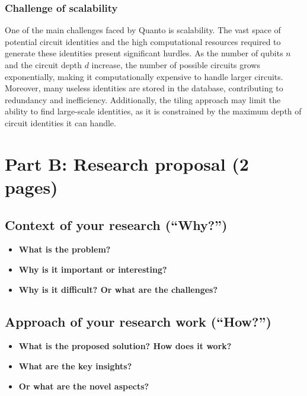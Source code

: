\subsubsection{Challenge of scalability}
One of the main challenges faced by Quanto is scalability. The vast space of potential circuit identities and the high computational resources required to generate these identities present significant hurdles. As the number of qubits $n$ and the circuit depth $d$ increase, the number of possible circuits grows exponentially, making it computationally expensive to handle larger circuits. Moreover, many useless identities are stored in the database, contributing to redundancy and inefficiency. Additionally, the tiling approach may limit the ability to find large-scale identities, as it is constrained by the maximum depth of circuit identities it can handle.

\section{Part B: Research proposal (2 pages)}

\subsection{Context of your research (``Why?'')}
\begin{itemize}
  \item \textbf{What is the problem?}
  \item \textbf{Why is it important or interesting?}
  \item \textbf{Why is it difficult? Or what are the challenges?}
\end{itemize}

\subsection{Approach of your research work (``How?'')}
\begin{itemize}
  \item \textbf{What is the proposed solution? How does it work?}
  \item \textbf{What are the key insights?}
  \item \textbf{Or what are the novel aspects?}
\end{itemize}

